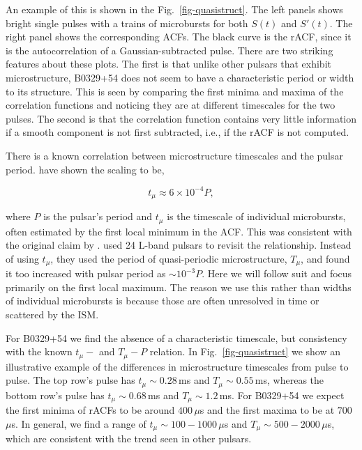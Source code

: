 An example of this is 
shown in the Fig.~\ref{fig-quasistruct}. The left 
panels shows bright single pulses with a
trains of microbursts for both $S(t)$ and $S'(t)$.
The right panel shows the corresponding ACFs. The 
black curve is the rACF, since it is 
the autocorrelation of a Gaussian-subtracted pulse. 
There are two striking features about these plots. The first 
is that unlike other pulsars that exhibit microstructure,
B0329+54 does not seem to have a characteristic period or width 
to its structure. This is seen by comparing the first 
minima and maxima of the correlation functions and 
noticing they are at different timescales for the two 
pulses. The second is that the correlation function 
contains very little information if a smooth 
component is not first subtracted, i.e., if 
the rACF is not computed.

There is a known correlation between microstructure 
timescales and the pulsar period. 
\citet{2002MNRAS.334..523K} have shown the scaling to be,

\begin{equation}
t_\mu \approx 6\times10^{-4} P,
\end{equation}

\noindent where $P$ is the pulsar's period and 
$t_\mu$ is the timescale of individual microbursts, 
often estimated by the first local minimum in the ACF. 
This was consistent with the original claim by 
\citet{1979ApJ...233..981C}. 
\citet{2015ApJ...806..236M} used 24 L-band pulsars 
to revisit the relationship. Instead of using $t_\mu$, 
they used the period of quasi-periodic microstructure, 
$T_\mu$, and found it too increased 
with pulsar period as $\sim 10^{-3} P$. Here we will follow suit and 
focus primarily on the first local maximum. The reason we use
this rather than widths of individual microbursts 
is because those are often unresolved in time or scattered 
by the ISM. 

For B0329+54 we find the absence of a characteristic 
timescale, but consistency with 
the known $t_\mu-$ and $T_\mu-P$ relation. 
In Fig.~\ref{fig-quasistruct} we show 
an illustrative example of the differences in 
microstructure timescales from pulse to pulse. The 
top row's pulse has $t_\mu \sim 0.28$\,ms and 
$T_\mu \sim 0.55$\,ms, whereas the bottom row's pulse 
has $t_\mu \sim 0.68$\,ms and $T_\mu \sim 1.2$\,ms.
For B0329+54 we expect the first minima of rACFs
to be around $400$\,$\mu$s and the first maxima 
to be at $700$\,$\mu$s. In general, we find a range of 
$t_\mu \sim 100-1000$\,$\mu$s and 
$T_\mu \sim 500-2000$\,$\mu$s, which are consistent 
with the trend seen in other pulsars. 

